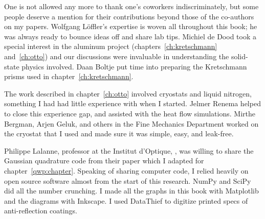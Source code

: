 One is not allowed any more to thank one's coworkers indiscriminately, but some people deserve a mention for their contributions beyond those of the co-authors on my papers.
Wolfgang L\"offler's expertise is woven all throughout this book; he was always ready to bounce ideas off and share lab tips.
Michiel de Dood took a special interest in the aluminum project (chapters~\ref{ch:kretschmann} and~\ref{ch:otto}) and our discussions were invaluable in understanding the solid-state physics involved.
Daan Boltje put time into preparing the Kretschmann prisms used in chapter~\ref{ch:kretschmann}.

The work described in chapter~\ref{ch:otto} involved cryostats and liquid nitrogen, something I had had little experience with when I started.
Jelmer Renema helped to close this experience gap, and assisted with the  heat flow simulations.
Mirthe Bergman, Arjen Geluk, and others in the Fine Mechanics Department worked on the cryostat that I used and made sure it was simple, easy, and leak-free.

Philippe Lalanne, professor at the Institut d'Optique, , was willing to share the Gaussian quadrature code from their paper\cite{Lalanne2006} which I adapted for chapter~\ref{qwp:chapter}.
Speaking of sharing computer code, I relied heavily on open source software almost from the start of this research.
NumPy and SciPy\cite{Jones2001} did all the number crunching.
I made all the graphs in this book with Matplotlib\cite{Hunter2007} and the diagrams with Inkscape.
I used DataThief \cite{Tummers2006} to digitize printed specs of anti-reflection coatings.

\newpage
\thispagestyle{empty}
\mbox{}
\newpage
\thispagestyle{empty}
\mbox{}
\newpage
\thispagestyle{empty}
\mbox{}
